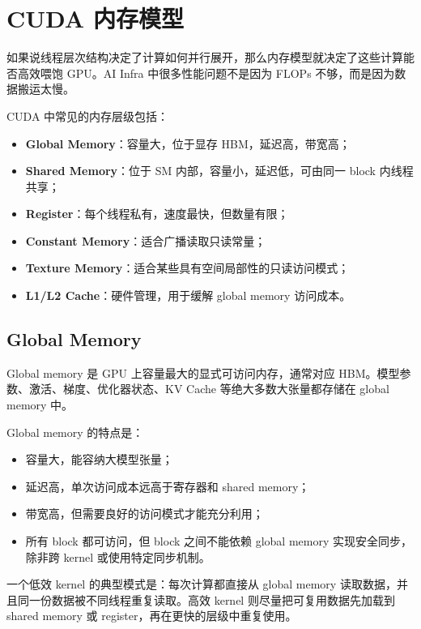 \section{CUDA 内存模型}
\label{sec:cuda-memory-model}

如果说线程层次结构决定了计算如何并行展开，那么内存模型就决定了这些计算能否高效喂饱 GPU。AI Infra 中很多性能问题不是因为 FLOPs 不够，而是因为数据搬运太慢。

CUDA 中常见的内存层级包括：

\begin{itemize}
  \item \textbf{Global Memory}：容量大，位于显存 HBM，延迟高，带宽高；
  \item \textbf{Shared Memory}：位于 SM 内部，容量小，延迟低，可由同一 block 内线程共享；
  \item \textbf{Register}：每个线程私有，速度最快，但数量有限；
  \item \textbf{Constant Memory}：适合广播读取只读常量；
  \item \textbf{Texture Memory}：适合某些具有空间局部性的只读访问模式；
  \item \textbf{L1/L2 Cache}：硬件管理，用于缓解 global memory 访问成本。
\end{itemize}

\subsection{Global Memory}
\label{subsec:global-memory}

Global memory 是 GPU 上容量最大的显式可访问内存，通常对应 HBM。模型参数、激活、梯度、优化器状态、KV Cache 等绝大多数大张量都存储在 global memory 中。

Global memory 的特点是：

\begin{itemize}
  \item 容量大，能容纳大模型张量；
  \item 延迟高，单次访问成本远高于寄存器和 shared memory；
  \item 带宽高，但需要良好的访问模式才能充分利用；
  \item 所有 block 都可访问，但 block 之间不能依赖 global memory 实现安全同步，除非跨 kernel 或使用特定同步机制。
\end{itemize}

一个低效 kernel 的典型模式是：每次计算都直接从 global memory 读取数据，并且同一份数据被不同线程重复读取。高效 kernel 则尽量把可复用数据先加载到 shared memory 或 register，再在更快的层级中重复使用。

